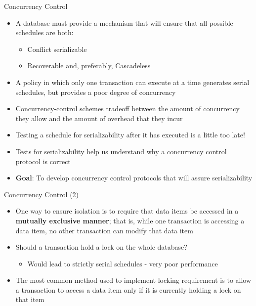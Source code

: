 \documentclass[aspectratio=169, xcolor=dvipsnames]{beamer}
\begin{document}
\begin{frame}{Concurrency Control}
    \begin{itemize}[<+->]
        \item A database must provide a mechanism that will ensure that all possible schedules are both:
        \begin{itemize}
            \item[$\triangleright$] Conflict serializable
            \item[$\triangleright$] Recoverable and, preferably, Cascadeless
        \end{itemize}
        \item A policy in which only one transaction can execute at a time generates serial schedules, but provides a poor degree of concurrency
        \item Concurrency-control schemes tradeoff between the amount of concurrency they allow and the amount of overhead that they incur
        \item Testing a schedule for serializability after it has executed is a little too late!
        \item Tests for serializability help us understand why a concurrency control protocol is correct
        \item \textbf{Goal}: To develop concurrency control protocols that will assure serializability
    \end{itemize}
\end{frame}

\begin{frame}{Concurrency Control (2)}
    \begin{itemize}[<+->]
        \item One way to ensure isolation is to require that data items be accessed in a \textbf{mutually exclusive manner}; that is, while one transaction is accessing a data item, no other transaction can modify that data item
        \item Should a transaction hold a lock on the whole database?
        \begin{itemize}
            \item[$\triangleright$] Would lead to strictly serial schedules - very poor performance
        \end{itemize}
        \item The most common method used to implement locking requirement is to allow a transaction to access a data item only if it is currently holding a lock on that item
    \end{itemize}
\end{frame}
\end{document}
